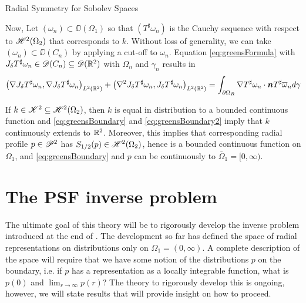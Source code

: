 \begin{chapter}{Radial Symmetry for Sobolev Spaces}
\begin{com}
Now, Let $(\omega_n) \subset \DD(\Omega_1)$ so that $(T^\sharp \omega_n)$ is the Cauchy sequence with respect to $\mathscr H^2(\Omega_2)$ that corresponds to $k$. 
Without loss of generality, we can take $(\omega_n) \subset \DD(C_n)$ by applying a cut-off to $\omega_n$.
Equation \eqref{eq:greensFormula} with $J_\delta T^\sharp \omega_n \in \mathscr D(C_n) \subseteq \mathscr D(\mathbb R^2)$ with $\Omega_n$ and $\gamma_n$ results in 
\begin{align} \label{eq:greensBoundary2}
  \left(\nabla J_\delta T^\sharp \omega_n, \nabla J_\delta T^\sharp \omega_n\right)_{L^2(\mathbb R^2)} + \left(\nabla^2 J_\delta T^\sharp \omega_n, J_\delta T^\sharp \omega_n\right)_{L^2(\mathbb R^2)} 
  =\int_{\partial \Omega_R} \nabla T^\sharp \omega_n \cdot \mbox{\boldmath$n$} T^\sharp \overline\omega_n d\gamma 
\end{align}

\begin{claim} \label{claim:pspace}
  If $k \in \mathscr K^2 \subseteq \mathscr H^2(\Omega_2)$, then $k$ is equal in distribution to a bounded continuous function and \eqref{eq:greensBoundary} and \eqref{eq:greensBoundary2} imply that $k$ continuously extends to $\mathbb R^2$. 
  Moreover, this implies that corresponding radial profile $p \in \mathscr P^2$ has $S_{1/2}(p) \in \mathscr H^2(\Omega_2)$, hence  is a bounded continuous function on $\Omega_1$, and \eqref{eq:greensBoundary} and $p$ can be continuously to $\bar \Omega_1 = [0,\infty)$.
\end{claim}
\end{com}

\section{The PSF inverse problem} 

The ultimate goal of this theory will be to rigorously develop the inverse problem introduced at the end of .
The development so far has defined the space of radial representations on distributions only on $\Omega_1 = (0,\infty)$.
A complete description of the space will require that we have some notion of the distributions $p$ on the boundary, i.e. if $p$ has a representation as a locally integrable function, what is $p(0)$ and $\displaystyle{\lim_{r\to\infty}p(r)}$?
The theory to rigorously develop this is ongoing, however, we will state results that will provide insight on how to proceed.


\end{chapter}
